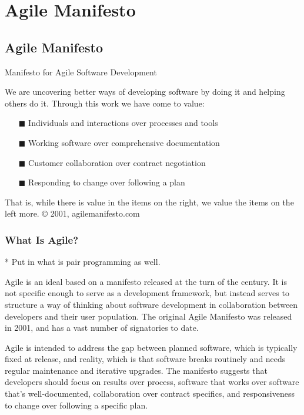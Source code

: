 
\chapter{Agile Manifesto} %

\label{AppendixA} %


\section{Agile Manifesto}

Manifesto for Agile Software Development

We are uncovering better ways of developing software by doing it and helping others do it.
Through this work we have come to value:
\begin{itemize}
\item[\tiny{$\blacksquare$}]  Individuals and interactions over processes and tools
\item[\tiny{$\blacksquare$}]  Working software over comprehensive documentation
\item[\tiny{$\blacksquare$}]  Customer collaboration over contract negotiation
\item[\tiny{$\blacksquare$}]  Responding to change over following a plan
\end{itemize}

That is, while there is value in the items on the right, we value the items on the left more.
© 2001, agilemanifesto.com

\subsection{What Is Agile?}
* Put in what is pair programming as well.

Agile is an ideal based on a manifesto released at the turn of the century. It is not specific enough to serve as a development framework, but instead serves to structure a way of thinking about software development in collaboration between developers and their user population. The original Agile Manifesto was released in 2001, and has a vast number of signatories to date. 

Agile is intended to address the gap between planned software, which is typically fixed at release, and reality, which is that software breaks routinely and needs regular maintenance and iterative upgrades. The manifesto suggests that developers should focus on results over process, software that works over software that’s well-documented, collaboration over contract specifics, and responsiveness to change over following a specific plan.

